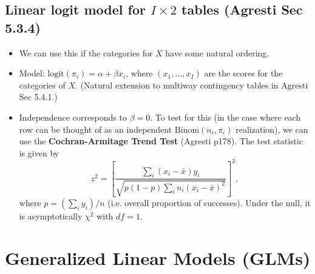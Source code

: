 \documentclass[twoside]{article}
\begin{document}
\subsection{Linear logit model for $I \times 2$ tables (Agresti Sec 5.3.4)}
\begin{itemize}
\item We can use this if the categories for $X$ have some natural ordering.
\item Model: $\text{logit}(\pi_i) = \alpha + \beta x_i$, where $(x_1, \dots, x_I)$ are the scores for the categories of $X$. (Natural extension to multiway contingency tables in Agresti Sec 5.4.1.)

\item Independence corresponds to $\beta = 0$. To test for this (in the case where each row can be thought of as an independent $\text{Binom}(n_i, \pi_i)$ realization), we can use the \textbf{Cochran-Armitage Trend Test} (Agresti p178). The test statistic is given by
\begin{equation*} z^2 = \left[\frac{\sum_i (x_i - \bar{x})y_i}{\sqrt{p(1-p) \sum_i n_i (x_i - \bar{x})^2}}\right]^2, \end{equation*}
where $p = \left( \sum_i y_i \right)/n$ (i.e. overall proportion of successes). Under the null, it is asymptotically $\chi^2$ with $df = 1$.
\end{itemize}

\section{Generalized Linear Models (GLMs)}
\end{document}
